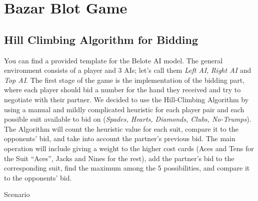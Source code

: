 \section{Bazar Blot Game}\label{ModelDescription}
\subsection{Hill Climbing Algorithm for Bidding}
\hspace{\parindent}You can find a provided template for the Belote AI model.
The general environment consists of a player and 3 AIs; let’s call them \textit{Left
AI}, \textit{Right AI} and \textit{Top AI}. The first stage of the game is the implementation of
the bidding part, where each player should bid a number for the hand they received
and try to negotiate with their partner. We decided to use the Hill-Climbing Algorithm by
using a manual and mildly complicated heuristic for each player pair and each
possible suit available to bid on (\textit{Spades, Hearts, Diamonds, Clubs, No-Trumps}). The
Algorithm will count the heuristic value for each suit, compare it to the opponents’
bid, and take into account the partner’s previous bid. The main operation will include
giving a weight to the higher cost cards (Aces and Tens for the Suit “Aces”, Jacks and
Nines for the rest), add the partner’s bid to the corresponding suit, find the maximum
among the 5 possibilities, and compare it to the opponents’ bid.
\par Scenario


